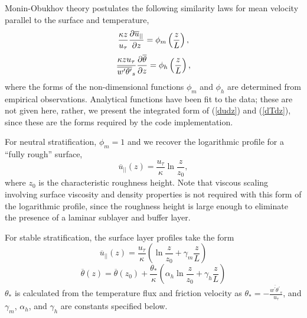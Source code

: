 Monin-Obukhov theory postulates the following similarity laws for mean
velocity parallel to the surface and temperature,
\begin{equation} \label{dudz}
\frac{\kappa z}{u_\tau}\frac{\partial{\overline{u}_{||}}}{\partial{z}} =
\phi_m\left(\frac{z}{L}\right),
\end{equation}
\begin{equation} \label{dTdz}
\frac{\kappa z u_\tau}{\overline{w^\prime \theta^\prime}_s}
\frac{\partial{\overline{\theta}}}{\partial{z}} = \phi_h\left(\frac{z}{L}\right),
\end{equation}
where the forms of the non-dimensional functions $\phi_m$ and $\phi_h$ are determined
from empirical observations. Analytical functions have been fit to the
data; these are not given here, rather, we present the integrated form
of (\ref{dudz}) and (\ref{dTdz}), since these are the forms required
by the code implementation.

For neutral stratification, $\phi_m = 1$ and we recover the
logarithmic profile for a ``fully rough'' surface,
\begin{equation} \label{vel_neutral}
\overline{u}_{||}(z) = \frac{u_\tau}{\kappa}\ln\frac{z}{z_0},
\end{equation}
where $z_0$ is the characteristic roughness height.  Note that viscous
scaling involving surface viscosity and density properties is not
required with this form of the logarithmic profile, since the
roughness height is large enough to eliminate the presence of a
laminar sublayer and buffer layer.

For stable stratification, the surface layer profiles take the form
\begin{equation} \label{vel_stable}
 \overline{u}_{||}(z) = \frac{u_\tau}{\kappa}\left(\ln\frac{z}{z_0} +
 \gamma_m\frac{z}{L}\right)
\end{equation}
\begin{equation}  \label{temp_stable}
\overline{\theta}(z) = \overline{\theta}(z_0) +
\frac{\theta_*}{\kappa} \left(\alpha_h\ln\frac{z}{z_0} +
\gamma_h\frac{z}{L}\right)
\end{equation}
$\theta_*$ is calculated from the temperature flux and friction velocity as
$\theta_* = -\frac{\overline{w^\prime \theta^\prime}_s}{u_\tau}$, and
$\gamma_m$, $\alpha_h$, and $\gamma_h$ are constants specified below.

